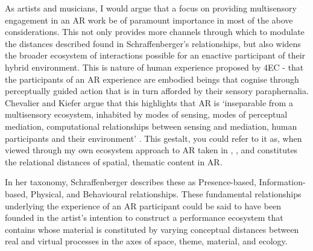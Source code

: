 As artists and musicians, I would argue that a focus on providing multisensory engagement in an AR work be of paramount importance in most of the above considerations. This not only provides more channels through which to modulate the distances described found in Schraffenberger's relationships, but also widens the broader ecosystem of interactions possible for an enactive participant of their hybrid environment. This is nature of human experience proposed by 4EC - that the participants of an AR experience are embodied beings that cognise through perceptually guided action that is in turn afforded by their sensory paraphernalia. 
Chevalier and Kiefer argue that this highlights that AR is `inseparable from a multisensory ecosystem, inhabited by modes of sensing, modes of perceptual mediation, computational relationships between sensing and mediation, human participants and their environment' \citeyearpar[p. 4]{chevalier2020}. This gestalt, you could refer to it as, when viewed through my own ecosystem approach to AR taken in \textit{}, \textit{}, and \textit{} constitutes the relational distances of spatial, thematic content in AR. 

In her taxonomy, Schraffenberger describes these as Presence-based, Information-based, Physical, and Behavioural relationships. These fundamental relationships underlying the experience of an AR participant could be said to have been founded in the artist's intention to construct a performance ecosystem that contains whose material is constituted by varying conceptual distances between real and virtual processes in the axes of space, theme, material, and ecology. 

